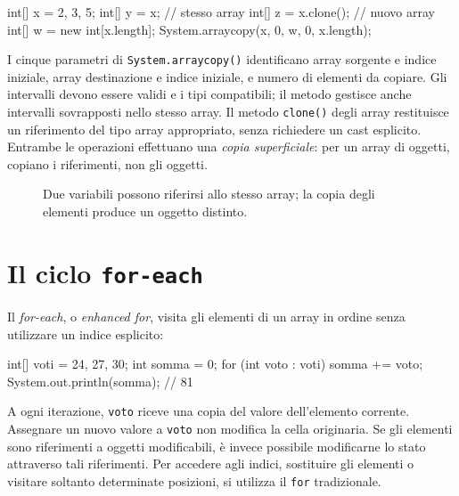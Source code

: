 \begin{unipdcode}[language=Java]
int[] x = {2, 3, 5};
int[] y = x;                       // stesso array
int[] z = x.clone();               // nuovo array
int[] w = new int[x.length];
System.arraycopy(x, 0, w, 0, x.length);
\end{unipdcode}

I cinque parametri di \texttt{System.arraycopy()} identificano
array sorgente e indice iniziale, array destinazione e indice
iniziale, e numero di elementi da copiare. Gli
intervalli devono essere validi e i tipi compatibili; il metodo
gestisce anche intervalli sovrapposti nello stesso array.
Il metodo \texttt{clone()} degli array restituisce un riferimento
del tipo array appropriato, senza richiedere un cast esplicito.
Entrambe le operazioni effettuano una \emph{copia superficiale}:
per un array di oggetti, copiano i riferimenti, non gli oggetti.

\begin{figure}[htbp]
  \centering
  
  \caption{Due variabili possono riferirsi allo stesso array;
  la copia degli elementi produce un oggetto distinto.}
  \label{fig:fi-java-array-copie}
\end{figure}

\clearpage

\section{Il ciclo \texttt{for-each}}
\label{sec:fi-java-array-for-each}

Il \emph{for-each}, o \emph{enhanced for}, visita gli elementi
di un array in ordine senza utilizzare un indice esplicito:

\begin{unipdcode}[language=Java]
int[] voti = {24, 27, 30};
int somma = 0;
for (int voto : voti) {
    somma += voto;
}
System.out.println(somma);  // 81
\end{unipdcode}

A ogni iterazione, \texttt{voto} riceve una copia del valore
dell'elemento corrente. Assegnare un nuovo valore a \texttt{voto}
non modifica la cella originaria. Se gli elementi sono riferimenti
a oggetti modificabili, è invece possibile modificarne lo stato
attraverso tali riferimenti.
Per accedere agli indici, sostituire gli elementi o visitare soltanto
determinate posizioni, si utilizza il \texttt{for} tradizionale.

